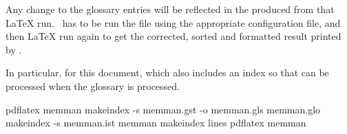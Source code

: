     Any change to the glossary entries will be reflected in the
 produced from that LaTeX run. \Lmakeindex\ has to be run
the  file using the appropriate  configuration file, 
and then LaTeX run again to get the corrected, sorted and formatted result
printed by \cmd{\printglossary}.

    In particular, for this document, which also includes an index so that
can be processed when the glossary is processed.
\begin{lcode}
pdflatex memman
makeindex -s memman.gst -o memman.gls memman.glo
makeindex -s memman.ist memman     %
makeindex lines                    %
pdflatex memman
\end{lcode} 







